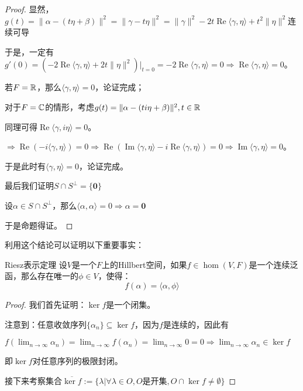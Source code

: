 \documentclass[12pt, a4paper, oneside, UTF8]{ctexbook}
\begin{document}
\begin{para}{0}
\begin{proof}
						显然，$g(t)=\|\alpha - (t\eta + \beta )\|^2=\|\gamma - t\eta \|^2=\|\gamma \|^2-2t\operatorname{Re}\langle \gamma ,\eta  \rangle+t^2\|\eta \|^2$连续可导

						于是，一定有$g'(0)=(-2\operatorname{Re}\langle \gamma ,\eta  \rangle+2t\|\eta \|^2)|_{t=0}=-2\operatorname{Re}\langle \gamma ,\eta  \rangle=0\Rightarrow \operatorname{Re}\langle \gamma ,\eta  \rangle=0$。

						若$F=\mathbb{R}$，那么$\langle \gamma ,\eta  \rangle=0$，论证完成；
						
						对于$F=\mathbb{C}$的情形，考虑$g(t)=\|\alpha - (t i \eta + \beta )\|^2,t \in \mathbb{R}$

						同理可得$\operatorname{Re}\langle \gamma ,i\eta  \rangle=0$。

						$\Rightarrow \operatorname{Re}(-i\langle \gamma ,\eta  \rangle)=0 \Rightarrow \operatorname{Re}(\operatorname{Im}\langle \gamma ,\eta  \rangle-i\operatorname{Re}\langle \gamma ,\eta  \rangle)=0\Rightarrow \operatorname{Im}\langle \gamma ,\eta  \rangle=0$。
					
						于是此时有$\langle \gamma ,\eta  \rangle=0$，论证完成。

						最后我们证明$S \cap S^{\perp}=\{\mathbf{0}\}$

						设$\alpha \in S\cap S^{\perp}$，那么$\langle \alpha ,\alpha \rangle = 0 \Rightarrow \alpha = \mathbf{0}$

						于是命题得证。
					\end{proof}
					利用这个结论可以证明以下重要事实：
					\begin{them}{Riesz表示定理}{}
						设$V$是一个$F$上的Hillbert空间，如果$f \in \hom(V,F)$是一个连续泛函，那么存在唯一的$\phi \in V$，使得：
						\begin{equation}
							f(\alpha ) = \langle \alpha,\phi  \rangle
						\end{equation}
					\end{them}
					\begin{proof}
						我们首先证明：$\ker f$是一个闭集。

						注意到：任意收敛序列$\{\alpha_n\} \subseteq \ker f$，因为$f$是连续的，因此有

						$f(\lim_{n \to \infty} \alpha_n)=\lim_{n \to \infty} f(\alpha_n)=\lim_{n \to \infty} 0=0 \Rightarrow \lim_{n \to \infty} \alpha_n \in \ker f$

						即$\ker f$对任意序列的极限封闭。

						接下来考察集合$\overline{\ker f}:=\{\lambda | \forall \lambda \in O,O\text{是开集},O \cap \ker f \neq \emptyset\}$


\end{proof}
\end{para}
\end{document}
